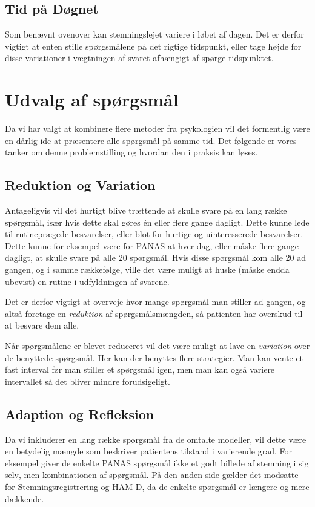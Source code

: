 \subsection{Tid på Døgnet}
Som benævnt ovenover kan stemningslejet variere i løbet af dagen.
Det er derfor vigtigt at enten stille spørgsmålene på det rigtige tidspunkt, eller tage højde for disse variationer i vægtningen af svaret afhængigt af spørge-tidspunktet.

\section{Udvalg af spørgsmål}
Da vi har valgt at kombinere flere metoder fra psykologien vil det formentlig være en dårlig ide at præsentere alle spørgsmål på samme tid.
Det følgende er vores tanker om denne problemstilling og hvordan den i praksis kan løses.

\subsection{Reduktion og Variation}
Antageligvis vil det hurtigt blive trættende at skulle svare på en lang række spørgsmål, især hvis dette skal gøres én eller flere gange dagligt.
Dette kunne lede til rutineprægede besvarelser, eller blot for hurtige og uinteresserede besvarelser.
Dette kunne for eksempel være for PANAS at hver dag, eller måske flere gange dagligt, at skulle svare på alle 20 spørgsmål.
Hvis disse spørgsmål kom alle 20 ad gangen, og i samme rækkefølge, ville det være muligt at huske (måske endda ubevist) en rutine i udfyldningen af svarene.

Det er derfor vigtigt at overveje hvor mange spørgsmål man stiller ad gangen, og altså foretage en \emph{reduktion} af spørgsmålsmængden, så patienten har overskud til at besvare dem alle.

Når spørgsmålene er blevet reduceret vil det være muligt at lave en \emph{variation} over de benyttede spørgsmål.
Her kan der benyttes flere strategier.
Man kan vente et fast interval før man stiller et spørgsmål igen, men man kan også variere intervallet så det bliver mindre forudsigeligt.

\subsection{Adaption og Refleksion}
Da vi inkluderer en lang række spørgsmål fra de omtalte modeller, vil dette være en betydelig mængde som beskriver patientens tilstand i varierende grad.
For eksempel giver de enkelte PANAS spørgsmål ikke et godt billede af stemning i sig selv, men kombinationen af spørgsmål.
På den anden side gælder det modsatte for Stemningsregistrering og HAM-D, da de enkelte spørgsmål er længere og mere dækkende.


